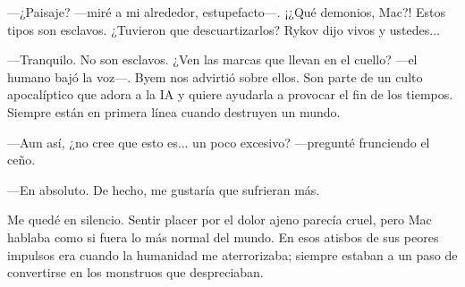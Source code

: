  —¿Paisaje? —miré a mi alrededor, estupefacto—. ¡¿Qué demonios, Mac?! Estos tipos son esclavos. ¿Tuvieron que descuartizarlos? Rykov dijo vivos y ustedes...

—Tranquilo. No son esclavos. ¿Ven las marcas que llevan en el cuello? —el humano bajó la voz—. Byem nos advirtió sobre ellos. Son parte de un culto apocalíptico que adora a la IA y quiere ayudarla a provocar el fin de los tiempos. Siempre están en primera línea cuando destruyen un mundo.

—Aun así, ¿no cree que esto es... un poco excesivo? —pregunté frunciendo el ceño.

—En absoluto. De hecho, me gustaría que sufrieran más.

Me quedé en silencio. Sentir placer por el dolor ajeno parecía cruel, pero Mac hablaba como si fuera lo más normal del mundo. En esos atisbos de sus peores impulsos era cuando la humanidad me aterrorizaba; siempre estaban a un paso de convertirse en los monstruos que despreciaban.
